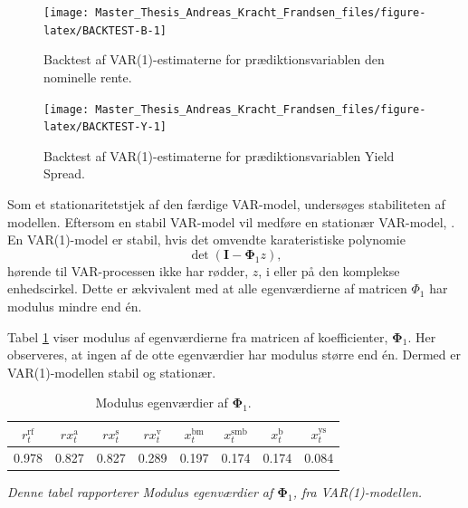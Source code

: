 \documentclass[
  a4paper,
  oneside]{memoir}
\begin{document}
\begin{figure}[H]

{\centering \texttt{[image: Master\_Thesis\_Andreas\_Kracht\_Frandsen\_files/figure-latex/BACKTEST-B-1]} 

}

\caption{Backtest af VAR(1)-estimaterne for prædiktionsvariablen den nominelle rente.}\label{fig:BACKTEST-B}
\end{figure}

\begin{figure}[H]

{\centering \texttt{[image: Master\_Thesis\_Andreas\_Kracht\_Frandsen\_files/figure-latex/BACKTEST-Y-1]} 

}

\caption{Backtest af VAR(1)-estimaterne for prædiktionsvariablen Yield Spread.}\label{fig:BACKTEST-Y}
\end{figure}

Som et stationaritetstjek af den færdige VAR-model, undersøges stabiliteten af modellen. Eftersom en stabil VAR-model vil medføre en stationær VAR-model, \citep{Lutkepohl2005}. En VAR(1)-model er stabil, hvis det omvendte karateristiske polynomie
\[\det\left(\bm{I} - \bm{\Phi}_1 z\right),\]
hørende til VAR-processen ikke har rødder, \(z\), i eller på den komplekse enhedscirkel. Dette er ækvivalent med at alle egenværdierne af matricen \(\Phi_1\) har modulus mindre end én.

Tabel \ref{tab:ROOTS-VAR} viser modulus af egenværdierne fra matricen af koefficienter, \(\bm{\Phi}_1\). Her observeres, at ingen af de otte egenværdier har modulus større end én. Dermed er VAR(1)-modellen stabil og stationær.

\begin{table}[H]

\caption{\label{tab:ROOTS-VAR}Modulus egenværdier af $\bm{\Phi}_1$.}
\centering
\begin{threeparttable}
\begin{tabular}[t]{cccccccc}
\toprule
$r_t^{\text{rf}}$ & $rx_t^{\text{a}}$ & $rx_t^{\text{s}}$ & $rx_t^{\text{v}}$ & $x_t^{\text{bm}}$ & $x_t^{\text{smb}}$ & $x_t^{\text{b}}$ & $x_t^{\text{ys}}$\\
\midrule
\rowcolor{gray!6}  0.978 & 0.827 & 0.827 & 0.289 & 0.197 & 0.174 & 0.174 & 0.084\\
\bottomrule
\end{tabular}
\begin{tablenotes}
\item \textit{Denne tabel rapporterer Modulus egenværdier af $\bm{\Phi}_1$, fra VAR(1)-modellen.}
\end{tablenotes}
\end{threeparttable}
\end{table}
\end{document}
